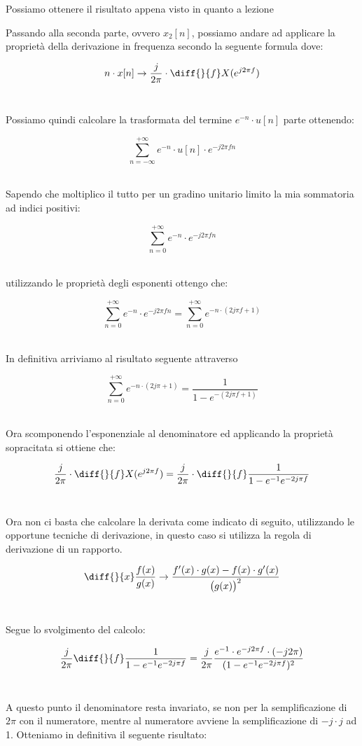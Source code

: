 \documentclass[../main.tex]{subfiles}
\begin{document}
Possiamo ottenere il risultato appena visto in quanto a lezione %

Passando alla seconda parte, ovvero $x_2[n]$, possiamo andare ad applicare la proprietà della derivazione in frequenza secondo la seguente formula dove:

\[ n \cdot x[n] \rightarrow \frac{j}{2\pi} \cdot \diff{}{f} X(e^{j2\pi f}) \]\

Possiamo quindi calcolare la trasformata del termine $e^{-n} \cdot u[n]$ parte ottenendo:

\[ \sum_{n = -\infty}^{+\infty}  e^{-n} \cdot u[n] \cdot e^{-j2\pi fn} \]\

Sapendo che moltiplico il tutto per un gradino unitario limito la mia sommatoria ad indici positivi:

\[ \sum_{n = 0}^{+\infty}  e^{-n} \cdot e^{-j2\pi fn} \]\

utilizzando le proprietà degli esponenti ottengo che:


\[ \sum_{n = 0}^{+\infty}  e^{-n} \cdot e^{-j2\pi fn}  = \sum_{n = 0}^{+\infty}  e ^{-n \cdot (2j\pi f + 1)}\]\

In definitiva arriviamo al risultato seguente attraverso %


\[ \sum_{n = 0}^{+\infty}  e ^{-n \cdot (2j\pi   + 1)} = \frac{1}{1 - e ^{-(2j\pi f + 1)} }\]\

Ora scomponendo l'esponenziale al denominatore ed applicando la proprietà sopracitata si ottiene che:

\[ \frac{j}{2\pi} \cdot \diff{}{f} X(e^{j2\pi f}) = \frac{j}{2\pi} \cdot \diff{}{f} \frac{1}{1 - e^{-1} e^{-2j\pi f}}\]\

Ora non ci basta che calcolare la derivata come indicato di seguito, utilizzando le opportune tecniche di derivazione, in questo caso si utilizza la regola di derivazione di un rapporto.

\[ \diff{}{x} \frac{f(x)}{g(x)} \rightarrow \frac{f'(x) \cdot g(x) - f(x) \cdot g'(x)}{\big( g(x) \big)^2} \]\

Segue lo svolgimento del calcolo:

\[ \frac{j}{2\pi} \diff{}{f} \frac{1}{1 - e^{-1} e^{-2j\pi f}} = \frac{j}{2\pi} \frac{e^{-1} \cdot e^{-j2\pi f} \cdot (-j2\pi)}{(1 - e^{-1} e^{-2j\pi f})^2} \]\

A questo punto il denominatore resta invariato, se non per la semplificazione di $2\pi$ con il numeratore, mentre al numeratore avviene la semplificazione di $-j \cdot j$ ad 1.
Otteniamo in definitiva il seguente risultato:
\end{document}
